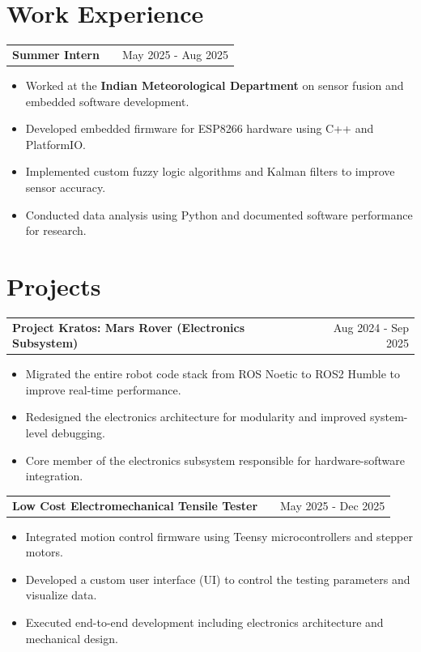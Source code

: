 \documentclass[a4paper,12pt]{article}
\makeatletter
\newenvironment{joblong}[2]
    {\begin{tabularx}{\linewidth}{@{}l X r@{}} \textbf{#1} & \hfill &  #2 \\[3.75pt] \end{tabularx}
    \begin{minipage}[t]{\linewidth}
    \begin{itemize}[nosep,after=\strut, leftmargin=1em, itemsep=3pt,label=--]}
    {\end{itemize} \end{minipage}}
\makeatother
\begin{document}
\section{Work Experience}
\begin{joblong}{Summer Intern \href{https://github.com/KevinBMathew/SensorFusion_ESP8266}{\raisebox{-0.05\height}\faGithub}}{May 2025 - Aug 2025}
\item Worked at the \textbf{Indian Meteorological Department} on sensor fusion and embedded software development.
\item Developed embedded firmware for ESP8266 hardware using C++ and PlatformIO.
\item Implemented custom fuzzy logic algorithms and Kalman filters to improve sensor accuracy.
\item Conducted data analysis using Python and documented software performance for research.
\end{joblong}

\section{Projects}

\begin{joblong}{Project Kratos: Mars Rover (Electronics Subsystem) \href{https://github.com/KevinBMathew/irc2025}{\raisebox{-0.05\height}\faGithub}}{Aug 2024 - Sep 2025}
\item Migrated the entire robot code stack from ROS Noetic to ROS2 Humble to improve real-time performance.
\item Redesigned the electronics architecture for modularity and improved system-level debugging.
\item Core member of the electronics subsystem responsible for hardware-software integration.
\end{joblong}

\begin{joblong}{Low Cost Electromechanical Tensile Tester}{May 2025 - Dec 2025}
\item Integrated motion control firmware using Teensy microcontrollers and stepper motors.
\item Developed a custom user interface (UI) to control the testing parameters and visualize data.
\item Executed end-to-end development including electronics architecture and mechanical design.
\end{joblong}
\end{document}
